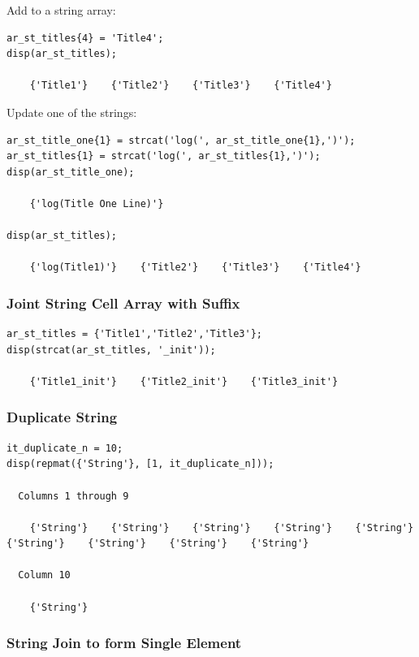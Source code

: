 \documentclass[
]{book}
\begin{document}
Add to a string array:

\begin{verbatim}
ar_st_titles{4} = 'Title4';
disp(ar_st_titles);

    {'Title1'}    {'Title2'}    {'Title3'}    {'Title4'}
\end{verbatim}

Update one of the strings:

\begin{verbatim}
ar_st_title_one{1} = strcat('log(', ar_st_title_one{1},')');
ar_st_titles{1} = strcat('log(', ar_st_titles{1},')');
disp(ar_st_title_one);

    {'log(Title One Line)'}

disp(ar_st_titles);

    {'log(Title1)'}    {'Title2'}    {'Title3'}    {'Title4'}
\end{verbatim}

\hypertarget{joint-string-cell-array-with-suffix}{%
\subsubsection{Joint String Cell Array with Suffix}\label{joint-string-cell-array-with-suffix}}

\begin{verbatim}
ar_st_titles = {'Title1','Title2','Title3'};
disp(strcat(ar_st_titles, '_init'));

    {'Title1_init'}    {'Title2_init'}    {'Title3_init'}
\end{verbatim}

\hypertarget{duplicate-string}{%
\subsubsection{Duplicate String}\label{duplicate-string}}

\begin{verbatim}
it_duplicate_n = 10;
disp(repmat({'String'}, [1, it_duplicate_n]));

  Columns 1 through 9

    {'String'}    {'String'}    {'String'}    {'String'}    {'String'}    {'String'}    {'String'}    {'String'}    {'String'}

  Column 10

    {'String'}
\end{verbatim}

\hypertarget{string-join-to-form-single-element}{%
\subsubsection{String Join to form Single Element}\label{string-join-to-form-single-element}}
\end{document}
